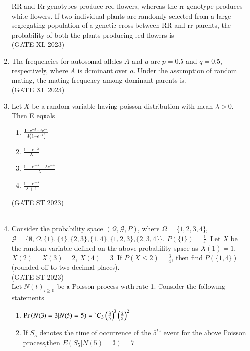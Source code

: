 \begin{enumerate}[label=\thechapter.\arabic*,ref=\thechapter.\theenumi]
RR and Rr genotypes produce red flowers, whereas the rr genotype produces
white flowers. If two individual plants are randomly selected from a large
segregating population of a genetic cross between RR and rr parents, the
probability of both the plants producing red flowers is\\
\hfill(GATE XL 2023)\\

\item The frequencies for autosomal alleles $A$ and $a$ are $p = 0.5$ and $q = 0.5$,
respectively, where $A$ is dominant over $a$. Under the assumption of random
mating, the mating frequency among dominant parents is.\\
\hfill(GATE XL 2023)\\

\item Let $X$ be a random variable having poisson distribution with mean $\lambda>0$. Then E equals
\begin{enumerate}
	\item $\frac{1-e^{-\lambda}-\lambda e^{-\lambda}}{\lambda\left(1-e^{-\lambda}\right)}$
	\item $\frac{1-e^{-\lambda}}{\lambda}$
	\item $\frac{1-e^{-\lambda}-\lambda e^{-\lambda}}{\lambda}$
	\item $\frac{1-e^{-\lambda}}{\lambda +1}$
\end{enumerate}
\hfill(GATE ST 2023)\\
\solution\\

\item Consider the probability space $(\Omega, \mathcal{G}, P)$, where 
   $ \Omega = \{1, 2, 3, 4\}$, 
    $\mathcal{G} = \{\emptyset, \Omega, \{1\}, \{4\}, \{2, 3\}, \{1, 4\}, \{1, 2, 3\}, \{2, 3, 4\}\}$, 
    $P(\{1\}) = \frac{1}{4}$.
Let $X$ be the random variable defined on the above probability space as
   $ X(1) = 1$, 
    $X(2) = X(3) = 2$, 
    $X(4) = 3$.
If $P(X \leq 2) = \frac{3}{4}$, then find $P(\{1, 4\})$ (rounded off to two decimal places).\\\hfill (GATE ST 2023)\\

Let ${N(t)}_{t\ge 0}$ be a Poisson process with rate 1. Consider the following statements. 
\begin{enumerate}[label=(\alph*)]
\item $\Pr\left(N(3)=3|N(5)=5\right)={{}^{5}\mkern-1muC_{3}}\left(\frac{3}{5}\right)^3 \left(\frac{2}{5}\right)^2$
\item If $S_5$ denotes the time of occurrence of the $5^{th}$ event for the above Poisson process,then $E(S_5|N(5)=3)=7$ \\

\end{enumerate}
\end{enumerate}

